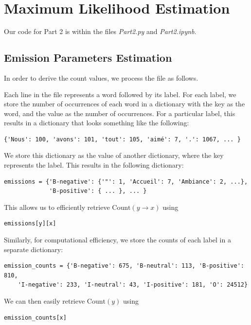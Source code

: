\documentclass{article}
\begin{document}
\setcounter{section}{1}


\section{Maximum Likelihood Estimation}
Our code for Part 2 is within the files \textit{Part2.py} and \textit{Part2.ipynb}.

\subsection{Emission Parameters Estimation} \label{sec:emissions}
In order to derive the count values, we process the file as follows.

Each line in the file represents a word followed by its label. For each label, we store the number of occurrences of each word in a dictionary with the key as the word, and the value as the number of occurrences. For a particular label, this results in a dictionary that looks something like the following:

\begin{verbatim}
{'Nous': 100, 'avons': 101, 'tout': 105, 'aimé': 7, '.': 1067, ... }
\end{verbatim}

We store this dictionary as the value of another dictionary, where the key represents the label. This results in the following dictionary:

\begin{verbatim}
emissions = {'B-negative': {'"': 1, 'Accueil': 7, 'Ambiance': 2, ...},
             'B-positive': { ... }, ... }
\end{verbatim}

This allows us to efficiently retrieve $\text{Count}(y \rightarrow x)$ using

\begin{verbatim}emissions[y][x]\end{verbatim}

Similarly, for computational efficiency, we store the counts of each label in a separate dictionary:

\begin{verbatim}
emission_counts = {'B-negative': 675, 'B-neutral': 113, 'B-positive': 810,
    'I-negative': 233, 'I-neutral': 43, 'I-positive': 181, 'O': 24512}
\end{verbatim}

We can then easily retrieve $\text{Count}(y)$ using

\begin{verbatim}emission_counts[x]\end{verbatim}
\end{document}

